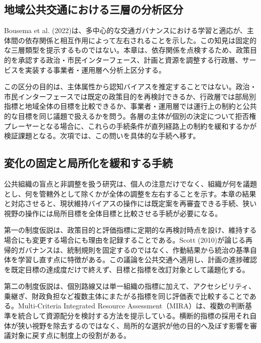 \subsection{地域公共交通における三層の分析区分}

Bousema et al. (2022)は、多中心的な交通ガバナンスにおける学習と適応が、主体間の依存関係と相互作用によって左右されることを示した\cite{bousema2022learning}。この知見は固定的な三層類型を提示するものではない。本章は、依存関係を点検するため、政策目的を承認する政治・市民インターフェース、計画と資源を調整する行政層、サービスを実装する事業者・運用層へ分析上区分する。

この区分の目的は、主体属性から認知バイアスを推定することではない。政治・市民インターフェースでは既定の政策目的を再検討できるか、行政層では部局別指標と地域全体の目標を比較できるか、事業者・運用層では運行上の制約と公共的な目標を同じ議題で扱えるかを問う。各層の主体が個別の決定について拒否権プレーヤーとなる場合に、これらの手続条件が直列経路上の制約を緩和するかが検証課題となる。次項では、この問いを具体的な手続へ移す。

\subsection{変化の固定と局所化を緩和する手続}

公共組織の盲点と非調整を扱う研究は、個人の注意だけでなく、組織が何を議題とし、何を管轄外として除くかが全体の調整を左右することを示す\cite{bach2019blind}。本章の結果と対応させると、現状維持バイアスの操作には既定案を再審査できる手続、狭い視野の操作には局所目標を全体目標と比較させる手続が必要になる。

第一の制度仮説は、政策目的と評価指標に定期的な再検討時点を設け、維持する場合にも変更する場合にも理由を記録することである。Scott (2010)が論じる再帰的ガバナンスは、統制規則を固定するのではなく、作動結果から統治の基準自体を学習し直す点に特徴がある\cite{scott2010reflexive}。この議論を公共交通へ適用し、計画の進捗確認を既定目標の達成度だけで終えず、目標と指標を改訂対象として議題化する。

第二の制度仮説は、個別路線又は単一組織の指標に加えて、アクセシビリティ、乗継ぎ、財政負担など複数主体にまたがる指標を同じ評価表で比較することである。Multi-Criteria Integrated Resource Assessment（MIRA）は、複数の判断基準を統合して資源配分を検討する方法を提示している\cite{stahl2002mira}。横断的指標の採用それ自体が狭い視野を除去するのではなく、局所的な選択が他の目的へ及ぼす影響を審議対象に戻す点に制度上の役割がある。

